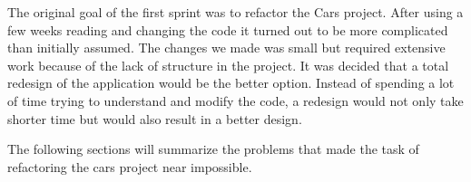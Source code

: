 The original goal of the first sprint was to refactor the Cars project. 
After using a few weeks reading and changing the code it turned out to be more complicated than initially assumed.
The changes we made was small but required extensive work because of the lack of structure in the project.
It was decided that a total redesign of the application would be the better option.
Instead of spending a lot of time trying to understand and modify the code, a redesign would not only take shorter time but would also result in a better design.

The following sections will summarize the problems that made the task of refactoring the cars project near impossible.